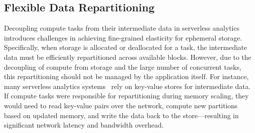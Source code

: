 \subsection{Flexible Data Repartitioning}
\label{ssec:fdr}

Decoupling compute tasks from their intermediate data in serverless analytics introduces challenges in achieving fine-grained elasticity for ephemeral storage. Specifically, when storage is allocated or deallocated for a task, the intermediate data must be efficiently repartitioned across available blocks. However, due to the decoupling of compute from storage and the large number of concurrent tasks, this repartitioning should not be managed by the application itself. For instance, many serverless analytics systems~\cite{locus, pocket} rely on key-value stores for intermediate data. If compute tasks were responsible for repartitioning during memory scaling, they would need to read key-value pairs over the network, compute new partitions based on updated memory, and write the data back to the store—resulting in significant network latency and bandwidth overhead.

